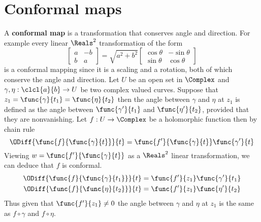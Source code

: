 \section{Conformal maps}
A \textbf{conformal map} is a transformation that conserves angle and direction. For example every linear \(\Reals^2\) transformation of the form 
\begin{equation*}
      \begin{bmatrix}
            a & -b\\
            b & a
      \end{bmatrix} = \sqrt{a^2 + b^2} \begin{bmatrix}
            \cos \theta & -\sin \theta\\
            \sin \theta & \cos \theta
      \end{bmatrix} 
\end{equation*}
is a conformal mapping since it is a scaling and a rotation, both of which conserve the angle and direction. 
Let \(U\) be an open set in \(\Complex\) and \(\gamma,\eta : \clcl{a}{b} \to U\)  be two complex valued curves. Suppose that \(z_1 = \func{\gamma}{t_1} = \func{\eta}{t_2}\) then the angle between \(\gamma\) and \(\eta\) at \(z_1\) is defined as the angle between \(\func{\gamma'}{t_1}\) and \(\func{\eta'}{t_2}\), provided that they are nonvanishing. Let \(f: U \to \Complex\) be a holomorphic function then by chain rule 
\begin{equation*}
      \ODiff{\func{f}{\func{\gamma}{t}}}{t} = \func{f'}{\func{\gamma}{t}} \func{\gamma'}{t}
\end{equation*}
Viewing \(w = \func{f'}{\func{\gamma}{t}}\) as a \(\Reals^2\) linear transformation, we can deduce that \(f\) is conformal. 
\begin{align*}
      \ODiff{\func{f}{\func{\gamma}{t_1}}}{t} &= \func{f'}{z_1} \func{\gamma'}{t_1}\\
      \ODiff{\func{f}{\func{\eta}{t_2}}}{t} &= \func{f'}{z_1} \func{\eta'}{t_2}
\end{align*}
Thus given that \(\func{f'}{z_1} \neq 0\) the angle between \(\gamma\) and \(\eta\) at \(z_1\) is the same as \(f \circ \gamma\) and \(f \circ \eta\).

